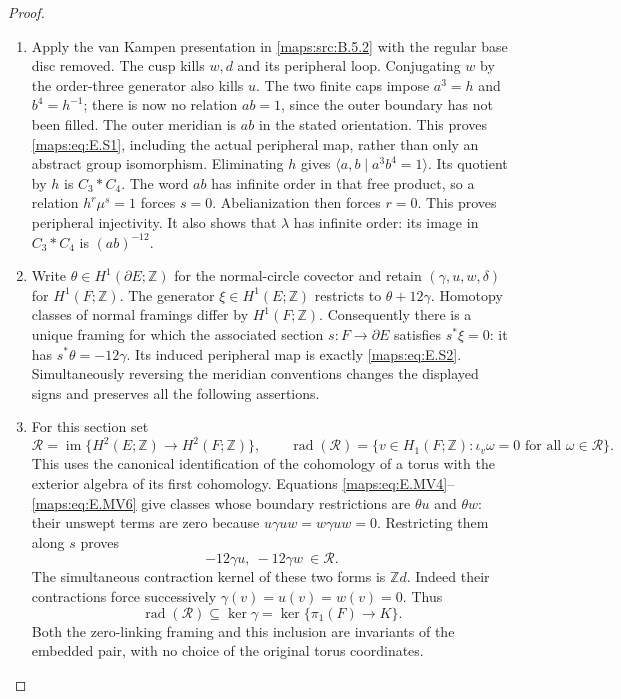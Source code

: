 \begin{proof}
\begin{enumerate}[label=\arabic*.,leftmargin=*]
\item Apply the van Kampen presentation in \ref{maps:src:B.5.2} with the regular base disc
removed. The cusp kills $w,d$ and its peripheral loop. Conjugating
$w$ by the order-three generator also kills $u$. The two finite caps
impose $a^3=h$ and $b^4=h^{-1}$; there is now no relation $ab=1$,
since the outer boundary has not been filled. The outer meridian
is $ab$ in the stated orientation. This proves \eqref{maps:eq:E.S1}, including
the actual peripheral map, rather than only an abstract group
isomorphism. Eliminating $h$ gives $\langle a,b\mid a^3b^4=1\rangle$.
Its quotient by $h$ is $C_3*C_4$. The word $ab$ has infinite order
in that free product, so a relation $h^r\mu^s=1$ forces $s=0$.
Abelianization then forces $r=0$. This proves peripheral injectivity.
It also shows that $\lambda$ has infinite order: its image in
$C_3*C_4$ is $(ab)^{-12}$.

\item Write $\theta\in H^1(\partial E;\mathbb Z)$ for the normal-circle
covector and retain $(\gamma,u,w,\delta)$ for $H^1(F;\mathbb Z)$.
The generator $\xi\in H^1(E;\mathbb Z)$ restricts to
$\theta+12\gamma$. Homotopy classes of normal framings differ by
$H^1(F;\mathbb Z)$. Consequently there is a unique framing for
which the associated section $s:F\to\partial E$ satisfies
$s^*\xi=0$: it has $s^*\theta=-12\gamma$. Its induced peripheral
map is exactly \eqref{maps:eq:E.S2}. Simultaneously reversing the meridian
conventions changes the displayed signs and preserves all the
following assertions.

\item For this section set
\[
 \mathcal R=\operatorname{im}\{H^2(E;\mathbb Z)
                         \longrightarrow H^2(F;\mathbb Z)\},
 \qquad
 \operatorname{rad}(\mathcal R)=
 \{v\in H_1(F;\mathbb Z):\iota_v\omega=0
                                    \text{ for all }\omega\in\mathcal R\}.
 \tag{E.S3}\label{maps:eq:E.S3}
\]
This uses the canonical identification of the cohomology of a torus
with the exterior algebra of its first cohomology. Equations
\eqref{maps:eq:E.MV4}--\eqref{maps:eq:E.MV6} give classes whose boundary restrictions are
$\theta u$ and $\theta w$: their unswept terms are zero because
$u\gamma uw=w\gamma uw=0$. Restricting them along $s$ proves
\[
                -12\gamma u,\ -12\gamma w\ \in\mathcal R.
 \tag{E.S4}\label{maps:eq:E.S4}
\]
The simultaneous contraction kernel of these two forms is
$\mathbb Z d$. Indeed their contractions force successively
$\gamma(v)=u(v)=w(v)=0$. Thus
\[
       \operatorname{rad}(\mathcal R)\subseteq\ker\gamma
        =\ker\{\pi_1(F)\longrightarrow K\}.
 \tag{E.S5}\label{maps:eq:E.S5}
\]
Both the zero-linking framing and this inclusion are invariants of
the embedded pair, with no choice of the original torus coordinates.


\end{enumerate}
\end{proof}
